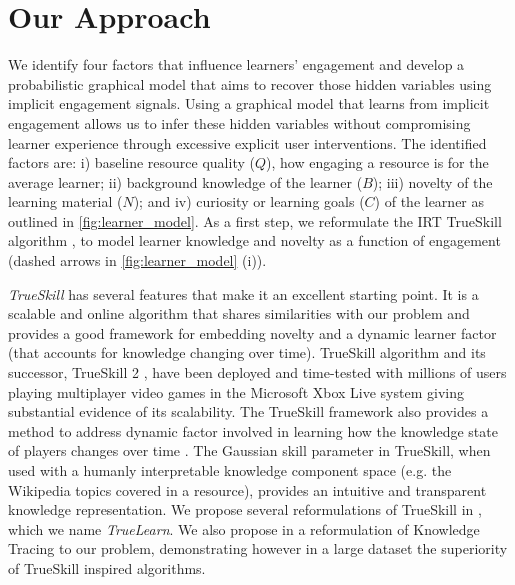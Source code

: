 \documentclass[letterpaper]{article} %
\begin{document}
\section{Our Approach}
We identify four factors that influence learners' engagement and develop a probabilistic graphical model that aims to recover those hidden variables using implicit engagement signals. Using a graphical model that learns from implicit engagement allows us to infer these hidden variables without compromising learner experience through excessive explicit user interventions. The identified factors are: i) baseline resource quality ($Q$), how engaging a resource is for the average learner; ii) background knowledge of the learner ($B$); iii) novelty of the learning material ($N$); and iv) curiosity or learning goals ($C$) of the learner as outlined in \figurename{ \ref{fig:learner_model}}. As a first step, we reformulate the IRT TrueSkill algorithm \cite{trueskill}, to model learner knowledge and novelty as a function of engagement (dashed arrows in \figurename{ \ref{fig:learner_model} (i)}). 

\emph{TrueSkill} has several features that make it an excellent starting point. It is a scalable and online algorithm that shares similarities with our problem and provides a good framework for embedding novelty and a dynamic learner factor (that accounts for knowledge changing over time). TrueSkill algorithm and its successor, TrueSkill 2 \cite{trueskill2}, have been deployed and time-tested with millions of users playing multiplayer video games in the Microsoft Xbox Live system giving substantial evidence of its scalability. The TrueSkill framework also provides a method to address dynamic factor involved in learning how the knowledge state of players changes over time \cite{NIPS2007_3331}. The Gaussian skill parameter in TrueSkill, when used with a humanly interpretable knowledge component space (e.g. the Wikipedia topics covered in a resource), provides an intuitive and transparent knowledge representation. We propose several reformulations of TrueSkill in \cite{Bulathwela2020}, which we name \emph{TrueLearn}. We also propose in \cite{Bulathwela2020} a reformulation of Knowledge Tracing to our problem, demonstrating however in a large dataset the superiority of TrueSkill inspired algorithms. 

\end{document}
